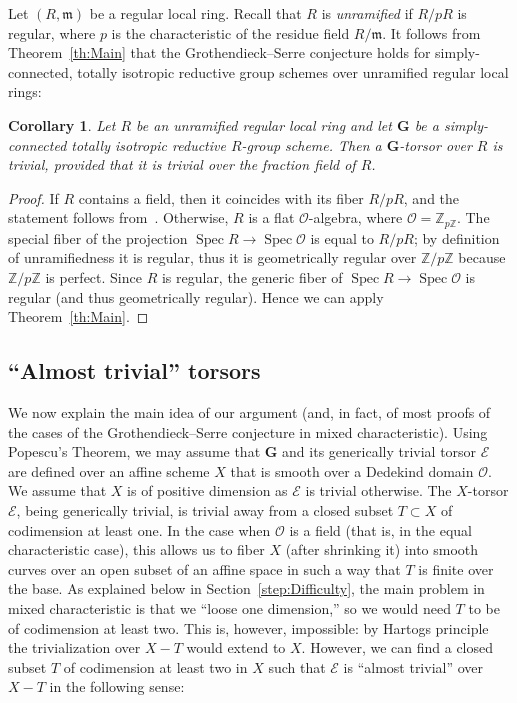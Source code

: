 \documentclass[11pt]{amsart}
\DeclareMathOperator\Spec{{Spec}}
\newcommand{\fm}{\mathfrak m}
\theoremstyle{plain}
\newtheorem{corollary}[theorem]{Corollary}
\theoremstyle{definition}
\theoremstyle{remark}
\newcommand\cE{{\mathcal{E}}}
\newcommand\cO{{\mathcal{O}}}
\newcommand\bG{{\mathbf G}}
\newcommand\Z{\mathbb Z}
\begin{document}
Let $(R,\fm)$ be a regular local ring. Recall that $R$ is \emph{unramified\/} if $R/pR$ is regular, where $p$ is the characteristic of the residue field $R/\fm$. It follows from Theorem~\ref{th:Main} that the Grothendieck--Serre conjecture holds for simply-connected, totally isotropic reductive group schemes over unramified regular local rings:

\begin{corollary}\label{cor:GrSerre}
    Let $R$ be an unramified regular local ring and let $\bG$ be a simply-connected totally isotropic reductive $R$-group scheme. Then a $\bG$-torsor over $R$ is trivial, provided that it is trivial over the fraction field of $R$.
\end{corollary}
\begin{proof}
  If $R$ contains a field, then it coincides with its fiber $R/pR$, and the statement follows from~\cite{FedorovPanin,PaninFiniteFieldsIzvestiya}. Otherwise, $R$ is a flat $\cO$-algebra, where $\cO=\Z_{p\Z}$. The special fiber of the projection $\Spec R\to\Spec\cO$ is equal to $R/pR$; by definition of unramifiedness it is regular, thus it is geometrically regular over $\Z/p\Z$ because $\Z/p\Z$ is perfect. Since $R$ is regular, the generic fiber of $\Spec R\to\Spec\cO$ is regular (and thus geometrically regular). Hence we can apply Theorem~\ref{th:Main}.
\end{proof}

\subsection{``Almost trivial'' torsors}\label{sect:AlmostTrivial} We now explain the main idea of our argument (and, in fact, of most proofs of the cases of the Grothendieck--Serre conjecture in mixed characteristic). Using Popescu's Theorem, we may assume that $\bG$ and its generically trivial torsor $\cE$ are defined over an affine scheme $X$ that is smooth over a Dedekind domain $\cO$. We assume that $X$ is of positive dimension as $\cE$ is trivial otherwise. The $X$-torsor $\cE$, being generically trivial, is trivial away from a closed subset $T\subset X$ of codimension at least one. In the case when $\cO$ is a field (that is, in the equal characteristic case), this allows us to fiber $X$ (after shrinking it) into smooth curves over an open subset of an affine space in such a way that $T$ is finite over the base. As explained below in Section~\ref{step:Difficulty}, the main problem in mixed characteristic is that we ``loose one dimension,'' so we would need $T$ to be of codimension at least two. This is, however, impossible: by Hartogs principle the trivialization over $X-T$ would extend to $X$. However, we can find a closed subset $T$ of codimension at least two in $X$ such that $\cE$ is ``almost trivial'' over $X-T$ in the following sense:
\end{document}
